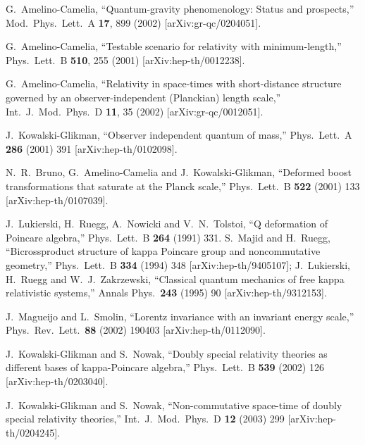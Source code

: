 \documentclass  [12pt] {article}
\begin{document}
\begin{thebibliography}{99}
G.~Amelino-Camelia, ``Quantum-gravity phenomenology: Status and prospects,''
Mod.\ Phys.\ Lett.\ A {\bf 17}, 899 (2002) [arXiv:gr-qc/0204051].

G.~Amelino-Camelia, ``Testable scenario for relativity with minimum-length,''
Phys.\ Lett.\ B {\bf 510}, 255 (2001) [arXiv:hep-th/0012238].

G.~Amelino-Camelia, ``Relativity in space-times with short-distance structure
governed by an observer-independent (Planckian) length scale,'' Int.\ J.\ Mod.\
Phys.\ D {\bf 11}, 35 (2002) [arXiv:gr-qc/0012051].

 J.~Kowalski-Glikman,
``Observer independent quantum of mass,'' Phys.\ Lett.\ A {\bf 286} (2001) 391
[arXiv:hep-th/0102098].

 N.~R.~Bruno, G.~Amelino-Camelia and J.~Kowalski-Glikman,
``Deformed boost transformations that saturate at the Planck scale,'' Phys.\
Lett.\ B {\bf 522} (2001) 133 [arXiv:hep-th/0107039].

 J.~Lukierski, H.~Ruegg, A.~Nowicki and V.~N.~Tolstoi,
``Q deformation of Poincare algebra,'' Phys.\ Lett.\ B {\bf 264} (1991) 331.
\bibitem{kappaM} S.~Majid and H.~Ruegg, ``Bicrossproduct structure of kappa Poincare group
and noncommutative geometry,'' Phys.\ Lett.\ B {\bf 334} (1994) 348
[arXiv:hep-th/9405107]; J.~Lukierski, H.~Ruegg and W.~J.~Zakrzewski,
``Classical quantum mechanics of free kappa relativistic systems,'' Annals
Phys.\  {\bf 243} (1995) 90 [arXiv:hep-th/9312153].

J.~Magueijo and L.~Smolin, ``Lorentz invariance with an invariant energy
scale,'' Phys.\ Rev.\ Lett.\  {\bf 88} (2002) 190403 [arXiv:hep-th/0112090].

 J.~Kowalski-Glikman and S.~Nowak,
``Doubly special relativity theories as different bases of kappa-Poincare
algebra,'' Phys.\ Lett.\ B {\bf 539} (2002) 126 [arXiv:hep-th/0203040].

\bibitem{Kowalski-Glikman:2002jr}
J.~Kowalski-Glikman and S.~Nowak, ``Non-commutative space-time of doubly
special relativity theories,'' Int.\ J.\ Mod.\ Phys.\ D {\bf 12} (2003) 299
[arXiv:hep-th/0204245].


\end{thebibliography}
\end{document}
